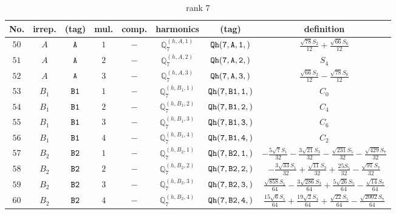 \documentclass[fleqn,8pt]{jsarticle}
\begin{document}
\begin{table}[ht!]
\begin{center}
\caption{rank 7}
\renewcommand{\arraystretch}{1.3}
\begin{tabular}{cccccccc} \hline \hline
No. & irrep. & (tag) & mul. & comp. & harmonics & (tag) & definition \\ \hline
$ 50 $ & $ A $ & $ {\tt A} $ & $ 1 $ & $ - $ & $ \mathbb{Q}_{7}^{(h,A,1)} $ & $ {\tt Qh(7,A,1,)} $ & $ \frac{\sqrt{78} S_{2}}{12} + \frac{\sqrt{66} S_{6}}{12} $ \\
$ 51 $ & $ A $ & $ {\tt A} $ & $ 2 $ & $ - $ & $ \mathbb{Q}_{7}^{(h,A,2)} $ & $ {\tt Qh(7,A,2,)} $ & $ S_{4} $ \\
$ 52 $ & $ A $ & $ {\tt A} $ & $ 3 $ & $ - $ & $ \mathbb{Q}_{7}^{(h,A,3)} $ & $ {\tt Qh(7,A,3,)} $ & $ \frac{\sqrt{66} S_{2}}{12} - \frac{\sqrt{78} S_{6}}{12} $ \\
$ 53 $ & $ B_{1} $ & $ {\tt B1} $ & $ 1 $ & $ - $ & $ \mathbb{Q}_{7}^{(h,B_{1},1)} $ & $ {\tt Qh(7,B1,1,)} $ & $ C_{0} $ \\
$ 54 $ & $ B_{1} $ & $ {\tt B1} $ & $ 2 $ & $ - $ & $ \mathbb{Q}_{7}^{(h,B_{1},2)} $ & $ {\tt Qh(7,B1,2,)} $ & $ C_{4} $ \\
$ 55 $ & $ B_{1} $ & $ {\tt B1} $ & $ 3 $ & $ - $ & $ \mathbb{Q}_{7}^{(h,B_{1},3)} $ & $ {\tt Qh(7,B1,3,)} $ & $ C_{6} $ \\
$ 56 $ & $ B_{1} $ & $ {\tt B1} $ & $ 4 $ & $ - $ & $ \mathbb{Q}_{7}^{(h,B_{1},4)} $ & $ {\tt Qh(7,B1,4,)} $ & $ C_{2} $ \\
$ 57 $ & $ B_{2} $ & $ {\tt B2} $ & $ 1 $ & $ - $ & $ \mathbb{Q}_{7}^{(h,B_{2},1)} $ & $ {\tt Qh(7,B2,1,)} $ & $ - \frac{5 \sqrt{7} S_{1}}{32} - \frac{3 \sqrt{21} S_{3}}{32} - \frac{\sqrt{231} S_{5}}{32} - \frac{\sqrt{429} S_{7}}{32} $ \\
$ 58 $ & $ B_{2} $ & $ {\tt B2} $ & $ 2 $ & $ - $ & $ \mathbb{Q}_{7}^{(h,B_{2},2)} $ & $ {\tt Qh(7,B2,2,)} $ & $ - \frac{3 \sqrt{33} S_{1}}{32} + \frac{\sqrt{11} S_{3}}{32} + \frac{25 S_{5}}{32} - \frac{\sqrt{91} S_{7}}{32} $ \\
$ 59 $ & $ B_{2} $ & $ {\tt B2} $ & $ 3 $ & $ - $ & $ \mathbb{Q}_{7}^{(h,B_{2},3)} $ & $ {\tt Qh(7,B2,3,)} $ & $ \frac{\sqrt{858} S_{1}}{64} - \frac{3 \sqrt{286} S_{3}}{64} + \frac{5 \sqrt{26} S_{5}}{64} - \frac{\sqrt{14} S_{7}}{64} $ \\
$ 60 $ & $ B_{2} $ & $ {\tt B2} $ & $ 4 $ & $ - $ & $ \mathbb{Q}_{7}^{(h,B_{2},4)} $ & $ {\tt Qh(7,B2,4,)} $ & $ \frac{15 \sqrt{6} S_{1}}{64} + \frac{19 \sqrt{2} S_{3}}{64} + \frac{\sqrt{22} S_{5}}{64} - \frac{\sqrt{2002} S_{7}}{64} $ \\

\end{tabular}
\end{center}
\end{table}
\end{document}
